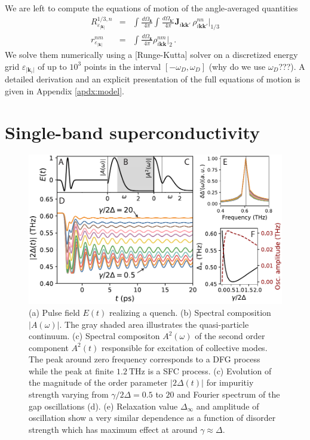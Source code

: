 \documentclass[aps,prb,reprint,noeprint,superscriptaddress]{revtex4-1}
\begin{document}
We are left to compute the equations of motion of the
angle-averaged quantities
\begin{eqnarray*}
  R^{1/3,n}_{\varepsilon_{|\mathbf{k}|}} &=& 
  \int_{}^{}\frac{d\Omega_{\mathbf{k}}}{4\pi}
  \int_{}^{}\frac{d\Omega_{\mathbf{k'}}}{4\pi}
  \mathbf{J}_{i\mathbf{kk'}} \, \rho_{i\mathbf{kk'}}^{nn}\big|_{1/3}
  \\
  r^{nm}_{\varepsilon_{|\mathbf{k}|}} &=& 
  \int_{}^{}\frac{d\Omega_{\mathbf{k}}}{4\pi}
  \rho_{i\mathbf{kk}}^{nm}\big|_{2} \,.
\end{eqnarray*}
We solve them numerically using a [Runge-Kutta] solver on a discretized energy grid
$\varepsilon_{|\mathbf{k}_i|}$ of up to $10^3$ points in the interval $\left[
  -\omega_D, \omega_D
\right]$ (why do we use $\omega_D$???).
A detailed derivation and an explicit presentation of the full equations of
motion is given in Appendix \ref{apdx:model}.









\section{Single-band superconductivity}

\begin{figure}[ht]
	\centering
	\includegraphics[width=\columnwidth]{figures/fig1.pdf}
	\caption{(a) Pulse field $E(t)$ realizing a quench. (b) Spectral
	composition $|A(\omega)|$. The gray shaded area illustrates the
quasi-particle continuum. (c) Spectral compositon $A^2(\omega)$ of the second
order component $A^2(t)$ responsible for excitation of collective modes. The
peak around zero frequency corresponds to a DFG process while the peak at finite
$\SI{1.2}{\tera\hertz}$ is a SFC process. (c) Evolution of the magnitude of the
order parameter $\left|2\Delta(t)\right|$ for impuritiy strength varying from
$\gamma/2\Delta=0.5$ to $20$ and Fourier spectrum of the gap oscillations (d).
(e) Relaxation value $\Delta_{\infty}$ and amplitude of oscillation show a very
similar dependence as a function of disorder strength which has maximum effect
at around $\gamma \approx \Delta$.}
\label{fig:singleband-gap}
\end{figure}
\label{sec:singleband}
\end{document}
